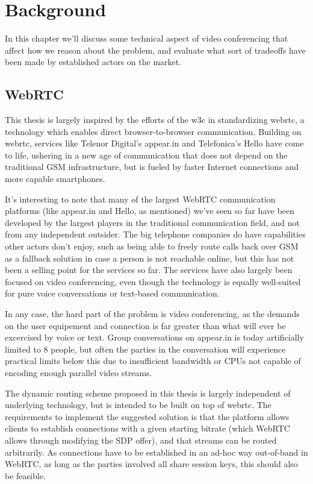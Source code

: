 \chapter{Background}
\label{chp:background}

In this chapter we'll discuss some technical aspect of video conferencing that affect how we reason about the problem, and evaluate what sort of tradeoffs have been made by established actors on the market.

\section{WebRTC}

This thesis is largely inspired by the efforts of the \gls{w3c} in standardizing \gls{webrtc}, a technology which enables direct browser-to-browser communication. Building on \gls{webrtc}, services like Telenor Digital's appear.in and Telefonica's Hello have come to life, ushering in a new age of communication that does not depend on the traditional GSM infrastructure, but is fueled by faster Internet connections and more capable smartphones.

It's interesting to note that many of the largest WebRTC communication platforms (like appear.in and Hello, as mentioned) we've seen so far have been developed by the largest players in the traditional communication field, and not from any independent outsider. The big telephone companies do have capabilities other actors don't enjoy, such as being able to freely route calls back over GSM as a fallback solution in case a person is not reachable online, but this has not been a selling point for the services so far. The services have also largely been focused on video conferencing, even though the technology is equally well-suited for pure voice conversations or text-based communication.

In any case, the hard part of the problem is video conferencing, as the demands on the user equipement and connection is far greater than what will ever be excercised by voice or text. Group conversations on appear.in is today artificially limited to 8 people, but often the parties in the conversation will experience practical limits below this due to insufficient bandwidth or CPUs not capable of encoding enough parallel video streams.

The dynamic routing scheme proposed in this thesis is largely independent of underlying technology, but is intended to be built on top of \gls{webrtc}. The requirements to implement the suggested solution is that the platform allows clients to establish connections with a given starting bitrate (which WebRTC allows through modifying the SDP offer), and that streams can be routed arbitrarily. As connections have to be established in an ad-hoc way out-of-band in WebRTC, as long as the parties involved all share session keys, this should also be feasible.

